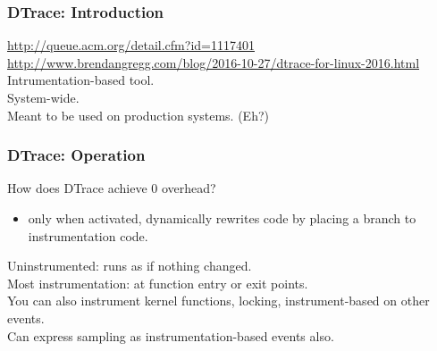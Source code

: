 \begin{frame}
  \frametitle{DTrace: Introduction}

\large
\begin{changemargin}{1.5cm}
\vspace*{-4em}
    \url{http://queue.acm.org/detail.cfm?id=1117401}\\
    \url{http://www.brendangregg.com/blog/2016-10-27/dtrace-for-linux-2016.html}\\[1em]

    Intrumentation-based tool.\\
    System-wide.\\
    Meant to be used on production systems. (Eh?)\\[1em]
     \end{changemargin}
\end{frame}

\begin{frame}
  \frametitle{DTrace: Operation}

\large
\begin{changemargin}{1.5cm}

    How does DTrace achieve 0 overhead?\\
\begin{itemize}
    \item only when activated, dynamically rewrites code by placing a branch to
      instrumentation code.
\end{itemize}

    Uninstrumented: runs as if nothing changed.\\[1em]

    Most instrumentation: at function entry or exit points.\\
    You can also instrument kernel functions, locking, instrument-based
      on other events.\\[1em]

    Can express sampling as instrumentation-based events also.
    \end{changemargin}
\end{frame}

